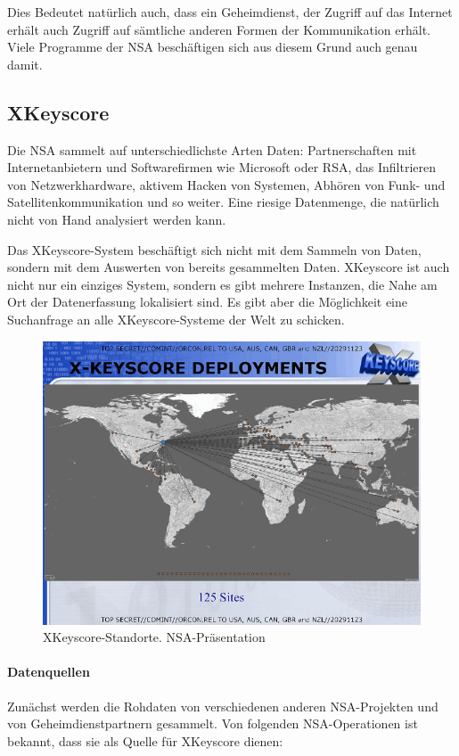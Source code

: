 \documentclass[12pt,a4paper]{scrartcl}
\begin{document}
Dies Bedeutet natürlich auch, dass ein Geheimdienst, der Zugriff auf das Internet erhält auch Zugriff auf sämtliche anderen Formen der Kommunikation erhält. Viele Programme der NSA beschäftigen sich aus diesem Grund auch genau damit.

\subsection{XKeyscore}
Die NSA sammelt auf unterschiedlichste Arten Daten: Partnerschaften mit Internetanbietern und Softwarefirmen wie Microsoft oder RSA, das Infiltrieren von Netzwerkhardware, aktivem Hacken von Systemen, Abhören von Funk- und Satellitenkommunikation und so weiter. Eine riesige Datenmenge, die natürlich nicht von Hand analysiert werden kann.

Das XKeyscore-System beschäftigt sich nicht mit dem Sammeln von Daten, sondern mit dem Auswerten von bereits gesammelten Daten. XKeyscore ist auch nicht nur ein einziges System, sondern es gibt mehrere Instanzen, die Nahe am Ort der Datenerfassung lokalisiert sind. Es gibt aber die Möglichkeit eine Suchanfrage an alle XKeyscore-Systeme der Welt zu schicken.

\begin{figure}[H]
\centering
\includegraphics[width=\textwidth]{images/xks_sites.png}
\caption{XKeyscore-Standorte. NSA-Präsentation \cite{nsa_xksdeployments}}
\end{figure}

\paragraph{Datenquellen}
Zunächst werden die Rohdaten von verschiedenen anderen NSA-Projekten und von Geheimdienstpartnern gesammelt. Von folgenden NSA-Operationen ist bekannt, dass sie als Quelle für XKeyscore dienen:
\end{document}
